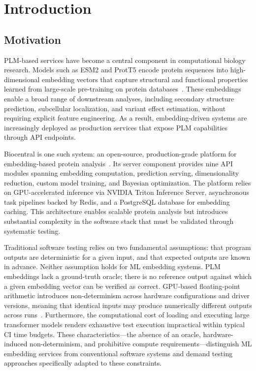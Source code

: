 
\chapter{Introduction}\label{chapter:introduction}


\section{Motivation}\label{sec:motivation}

\ac{PLM}-based services have become a central component in computational biology research. Models such as ESM2 and ProtT5 encode protein sequences into high-dimensional embedding vectors that capture structural and functional properties learned from large-scale pre-training on protein databases~\cite{elnaggar2021prottranscrackinglanguagelifes}. These embeddings enable a broad range of downstream analyses, including secondary structure prediction, subcellular localization, and variant effect estimation, without requiring explicit feature engineering. As a result, embedding-driven systems are increasingly deployed as production services that expose \ac{PLM} capabilities through \ac{API} endpoints.

Biocentral is one such system: an open-source, production-grade platform for embedding-based protein analysis~\cite{Franz2025}. Its server component provides nine \ac{API} modules spanning embedding computation, prediction serving, dimensionality reduction, custom model training, and Bayesian optimization. The platform relies on \ac{GPU}-accelerated inference via NVIDIA Triton Inference Server, asynchronous task pipelines backed by Redis, and a PostgreSQL database for embedding caching. This architecture enables scalable protein analysis but introduces substantial complexity in the software stack that must be validated through systematic testing.

Traditional software testing relies on two fundamental assumptions: that program outputs are deterministic for a given input, and that expected outputs are known in advance. Neither assumption holds for \ac{ML} embedding systems. \ac{PLM} embeddings lack a ground-truth oracle; there is no reference output against which a given embedding vector can be verified as correct. \ac{GPU}-based floating-point arithmetic introduces non-determinism across hardware configurations and driver versions, meaning that identical inputs may produce numerically different outputs across runs~\cite{chandrasekaran2023testevaluationbest}. Furthermore, the computational cost of loading and executing large transformer models renders exhaustive test execution impractical within typical \ac{CI} time budgets. These characteristics---the absence of an oracle, hardware-induced non-determinism, and prohibitive compute requirements---distinguish \ac{ML} embedding services from conventional software systems and demand testing approaches specifically adapted to these constraints.

